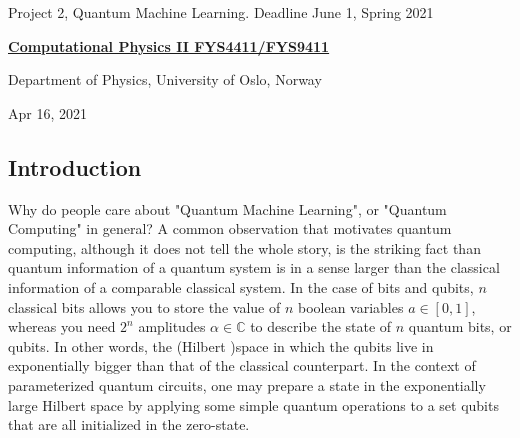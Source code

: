 \documentclass[%
oneside,                 %
final,                   %
10pt]{article}
\begin{document}

\newcommand{\exercisesection}[1]{\subsection*{#1}}






\thispagestyle{empty}

\begin{center}
{\LARGE\bf
\begin{spacing}{1.25}
Project 2, Quantum Machine Learning. Deadline June 1, Spring 2021
\end{spacing}
}
\end{center}


\begin{center}
{\bf \href{{http://www.uio.no/studier/emner/matnat/fys/FYS4411/index-eng.html}}{Computational Physics II FYS4411/FYS9411}}
\end{center}

    \begin{center}
\centerline{{\small Department of Physics, University of Oslo, Norway}}
\end{center}
    

\begin{center}
Apr 16, 2021
\end{center}

\vspace{1cm}


\subsection{Introduction}

Why do people care about "Quantum Machine Learning", or "Quantum Computing" in general? A common observation that motivates quantum computing,
although it does not tell the whole story, is the striking fact than quantum information of a quantum system is in a sense
larger than the classical information of a comparable classical system. In the case of
bits and qubits, $n$ classical bits allows you to store the value of $n$ boolean variables $a \in [0,1]$,
whereas you need $2^n$ amplitudes $\alpha \in \mathbb{C}$ to describe the state of $n$ quantum bits, or qubits.
In other words, the (Hilbert )space in which the qubits live in exponentially bigger than that of the classical
counterpart. In the context of parameterized quantum circuits, one may prepare a state in the exponentially
large Hilbert space by applying some simple quantum operations to a set qubits that are all initialized in the zero-state.
\end{document}
